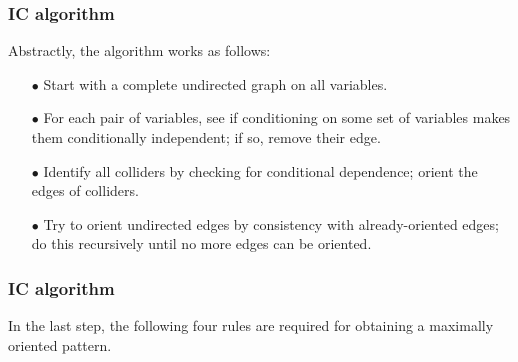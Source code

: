 \documentclass{beamer}
\begin{document}
\begin{frame}
    \frametitle{IC algorithm}
    Abstractly, the algorithm works as follows:
    \begin{itemize}
        \item[$\bullet$] Start with a complete undirected graph on all variables.
        \item[$\bullet$] For each pair of variables, see if conditioning on some set of variables
        makes them conditionally independent; if so, remove their edge.
        \item[$\bullet$] Identify all colliders by checking for conditional dependence; orient the
        edges of colliders.
        \item[$\bullet$] Try to orient undirected edges by consistency with already-oriented edges;
        do this recursively until no more edges can be oriented.           
    \end{itemize}
\end{frame}

\begin{frame}
    \frametitle{IC algorithm}
    \begin{flushleft}
        In the last step, the following four rules are required for obtaining a maximally oriented pattern.
    \end{flushleft}
\end{frame}
\end{document}

